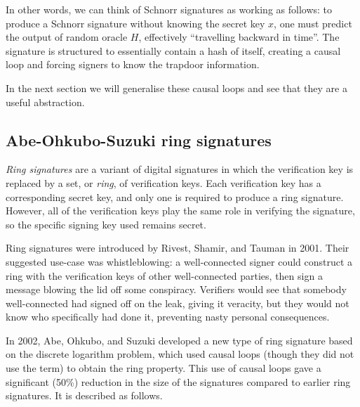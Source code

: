 \documentclass[letterpaper]{article}
\begin{document}
In other words,
we can think of Schnorr signatures as working as follows: to produce a
Schnorr signature without knowing the secret key $x$, one must predict
the output of random oracle $H$, effectively ``travelling backward in time''.
The signature is structured to essentially contain a hash of itself,
creating a causal loop and forcing signers to know the trapdoor information.

In the next section we will generalise these causal loops and see that
they are a useful abstraction.

\subsection{Abe-Ohkubo-Suzuki ring signatures}

\emph{Ring signatures} are a variant of digital signatures in which the
verification key is replaced by a set, or \emph{ring}, of verification keys.
Each verification key has a corresponding secret key, and only one is
required to produce a ring signature. However, all of the verification keys
play the same role in verifying the signature, so the specific signing key
used remains secret.

Ring signatures were introduced by Rivest, Shamir, and Tauman\cite{rivest+shamir+tauman2001}
in 2001. Their suggested use-case was whistleblowing: a well-connected signer
could construct a ring with the verification keys of other well-connected
parties, then sign a message blowing the lid off some conspiracy. Verifiers
would see that somebody well-connected had signed off on the leak, giving it
veracity, but they would not know who specifically had done it, preventing
nasty personal consequences.

In 2002, Abe, Ohkubo, and Suzuki developed a new type of ring signature based
on the discrete logarithm problem\cite{abe+ohkubo+suzuki2002}, which used
causal loops (though they did not use the term) to obtain the ring property.
This use of causal loops gave a significant (50\%) reduction in the size of
the signatures compared to earlier ring signatures. It is described as follows.
\end{document}
